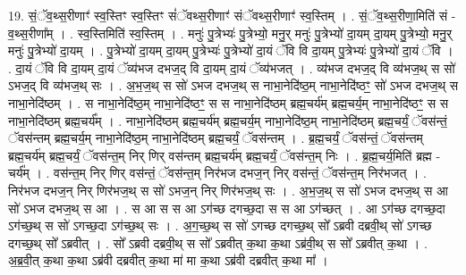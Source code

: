 \documentclass[17pt]{extarticle}
\begin{document}
19. सं॒ॅव॒थ्स॒रीणाꣳ॑ स्व॒स्तिꣳ स्व॒स्तिꣳ सं॑ॅवथ्स॒रीणाꣳ॑ संॅवथ्स॒रीणाꣳ॑ स्व॒स्तिम् । . सं॒ॅव॒थ्स॒रीणा॒मिति॑ सं - व॒थ्स॒रीणा᳚म् । . स्व॒स्तिमिति॑ स्व॒स्तिम् । . मनुः॑ पु॒त्रेभ्यः॑ पु॒त्रेभ्यो॒ मनु॒र् मनुः॑ पु॒त्रेभ्यो॑ दा॒यम् दा॒यम् पु॒त्रेभ्यो॒ मनु॒र् मनुः॑ पु॒त्रेभ्यो॑ दा॒यम् । . पु॒त्रेभ्यो॑ दा॒यम् दा॒यम् पु॒त्रेभ्यः॑ पु॒त्रेभ्यो॑ दा॒यं ॅवि वि दा॒यम् पु॒त्रेभ्यः॑ पु॒त्रेभ्यो॑ दा॒यं ॅवि । . दा॒यं ॅवि वि दा॒यम् दा॒यं ॅव्य॑भज दभज॒द् वि दा॒यम् दा॒यं ॅव्य॑भजत् । . व्य॑भज दभज॒द् वि व्य॑भज॒थ् स सो॑ ऽभज॒द् वि व्य॑भज॒थ् सः । . अ॒भ॒ज॒थ् स सो॑ ऽभज दभज॒थ् स नाभा॒नेदि॑ष्ठ॒म् नाभा॒नेदि॑ष्ठꣳ॒॒ सो॑ ऽभज दभज॒थ् स नाभा॒नेदि॑ष्ठम् । . स नाभा॒नेदि॑ष्ठ॒म् नाभा॒नेदि॑ष्ठꣳ॒॒ स स नाभा॒नेदि॑ष्ठम् ब्रह्म॒चर्य॑म् ब्रह्म॒चर्य॒म् नाभा॒नेदि॑ष्ठꣳ॒॒ स स नाभा॒नेदि॑ष्ठम् ब्रह्म॒चर्य᳚म् । . नाभा॒नेदि॑ष्ठम् ब्रह्म॒चर्य॑म् ब्रह्म॒चर्य॒म् नाभा॒नेदि॑ष्ठ॒म् नाभा॒नेदि॑ष्ठम् ब्रह्म॒चर्यं॒ ॅवस॑न्तं॒ ॅवस॑न्तम् ब्रह्म॒चर्य॒म् नाभा॒नेदि॑ष्ठ॒म् नाभा॒नेदि॑ष्ठम् ब्रह्म॒चर्यं॒ ॅवस॑न्तम् । . ब्र॒ह्म॒चर्यं॒ ॅवस॑न्तं॒ ॅवस॑न्तम् ब्रह्म॒चर्य॑म् ब्रह्म॒चर्यं॒ ॅवस॑न्त॒म् निर् णिर् वस॑न्तम् ब्रह्म॒चर्य॑म् ब्रह्म॒चर्यं॒ ॅवस॑न्त॒म् निः । . ब्र॒ह्म॒चर्य॒मिति॑ ब्रह्म - चर्य᳚म् । . वस॑न्त॒म् निर् णिर् वस॑न्तं॒ ॅवस॑न्त॒म् निर॑भज दभज॒न् निर् वस॑न्तं॒ ॅवस॑न्त॒म् निर॑भजत् । . निर॑भज दभज॒न् निर् णिर॑भज॒थ् स सो॑ ऽभज॒न् निर् णिर॑भज॒थ् सः । . अ॒भ॒ज॒थ् स सो॑ ऽभज दभज॒थ् स आ सो॑ ऽभज दभज॒थ् स आ । . स आ स स आ ऽग॑च्छ दगच्छ॒दा स स आ ऽग॑च्छत् । . आ ऽग॑च्छ दगच्छ॒दा ऽग॑च्छ॒थ् स सो॑ ऽगच्छ॒दा ऽग॑च्छ॒थ् सः । . अ॒ग॒च्छ॒थ् स सो॑ ऽगच्छ दगच्छ॒थ् सो᳚ ऽब्रवी दब्रवी॒थ् सो॑ ऽगच्छ दगच्छ॒थ् सो᳚ ऽब्रवीत् । . सो᳚ ऽब्रवी दब्रवी॒थ् स सो᳚ ऽब्रवीत् क॒था क॒था ऽब्र॑वी॒थ् स सो᳚ ऽब्रवीत् क॒था । . अ॒ब्र॒वी॒त् क॒था क॒था ऽब्र॑वी दब्रवीत् क॒था मा॑ मा क॒था ऽब्र॑वी दब्रवीत् क॒था मा᳚ । \newline
\end{document}
